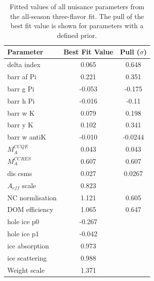 \begin{table}
    \centering
    \caption{Fitted values of all nuisance parameters from the all-season three-flavor fit. The pull of the best fit value is shown for parameters with a defined prior.}
    \label{tab:nuisance_params_fittedval}
    \begin{tabular}{lSS} \toprule
        Parameter  & {Best Fit Value} &  {Pull ($\sigma$)} \\ \midrule
        delta index & 0.065 & 0.648 \\
        barr af Pi & 0.221  & 0.351 \\
        barr g Pi & -0.053  & -0.175 \\
        barr h Pi & -0.016  & -0.11 \\
        barr w K & 0.079  & 0.198 \\
        barr y K & 0.102  & 0.341 \\
        barr w antiK & -0.010  & -0.0244 \\
        $M_{A}^{CCQE}$ &  0.043 & 0.043 \\
        $M_{A}^{CCRES}$ & 0.607 & 0.607  \\
        dis csms & 0.027  & 0.0267 \\ 
        $A_{eff}$ scale & 0.823 &  \\
        NC normlisation & 1.121 &  0.605 \\
        DOM efficiency & 1.065  & 0.647 \\
        hole ice p0 & -0.267  &  \\
        hole ice p1 & -0.042  &  \\
        ice absorption & 0.973  &  \\
        ice scattering & 0.988 &  \\ 
        Weight scale & 1.371  &  \\
        \bottomrule
    \end{tabular}
\end{table}


